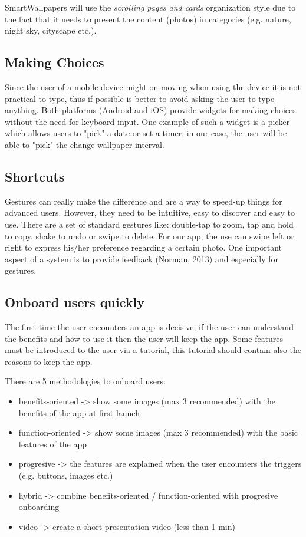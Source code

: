 \documentclass[version=last,fontsize=13pt]{scrartcl}
\begin{document}
	SmartWallpapers will use the \textit{scrolling pages and cards} organization style due to the fact that it needs to present the content (photos) in categories (e.g. nature, night sky, cityscape etc.).

	\subsection{Making Choices}
	Since the user of a mobile device might  on moving when using the device it is not practical to type, thus if possible is better to avoid asking the user to type anything. Both platforms (Android and iOS) provide widgets for making choices without the need for keyboard input. One example of such a widget is a picker which allows users to "pick" a date or set a timer, in our case, the user will be able to "pick" the change wallpaper interval.

	\subsection{Shortcuts}
	Gestures can really make the difference and are a way to speed-up things for advanced users. However, they need to be intuitive, easy to discover and easy to use. There are a set of standard gestures like: double-tap to zoom, tap and hold to copy, shake to undo or swipe to delete. For our app, the use can swipe left or right to express his/her preference regarding a certain photo. One important aspect of a system is to provide feedback (Norman, 2013) and especially for gestures.


	\subsection{Onboard users quickly}
	The first time the user encounters an app is decisive; if the user can understand the benefits and how to use it then the user will keep the app.
Some features must be introduced to the user via a tutorial, this tutorial should contain also the reasons to keep the app.

	There are 5 methodologies to onboard users:
	
	\begin{itemize}
	
		\item benefits-oriented -> show some images (max 3 recommended) with the benefits of the app at first launch

		\item function-oriented -> show some images (max 3 recommended) with the basic features of the app

		\item progresive        -> the features are explained when the user encounters the triggers (e.g. buttons, images etc.)

		\item hybrid            -> combine benefits-oriented / function-oriented with progresive onboarding 
		
		\item video -> create a short presentation video (less than 1 min) 

	\end{itemize}
	
\end{document}
